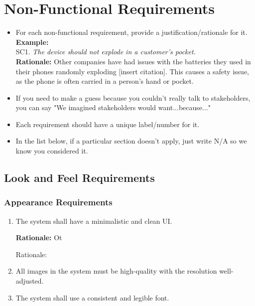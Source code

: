 \documentclass[]{article}
\begin{document}

\section{Non-Functional Requirements}
\label{sec:non-functional_requirements}


\begin{itemize}
	\item For each non-functional requirement, provide a justification/rationale for it.\\
	{\bf Example:} \\
	SC1. \emph{The device should not explode in a customer’s pocket.}\\
	{\bf Rationale:} Other companies have had issues with the batteries they used in their phones randomly exploding [insert citation]. This causes a safety issue, as the phone is often carried in a person's hand or pocket.	
	\item If you need to make a guess because you couldn't really talk to stakeholders, you can say "We imagined stakeholders would want...because..."
	\item Each requirement should have a unique label/number for it.
	\item In the list below, if a particular section doesn't apply, just write N/A so we know you considered it.
\end{itemize}

\subsection{Look and Feel Requirements}
\label{sub:look_and_feel_requirements}

\subsubsection{Appearance Requirements}
\label{ssub:appearance_requirements}
\begin{enumerate}[{LF-A}1. ]
	\item The system shall have a minimalistic and clean UI.
	
	{\bf Rationale:} Ot

	Rationale: 
	\item All images in the system must be high-quality with the resolution well-adjusted.
	\item The system shall use a consistent and legible font.
\end{enumerate}
\end{document}
